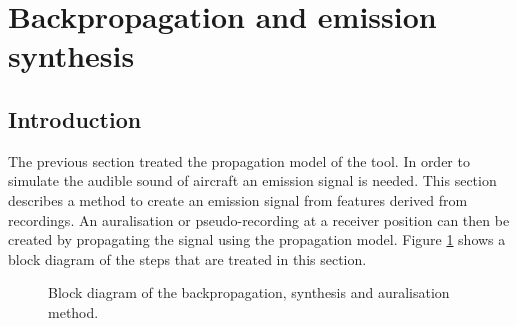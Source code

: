 \section{Backpropagation and emission synthesis}\label{sec:tool:synthesis}

\subsection{Introduction}
The previous section treated the propagation model of the tool. In order to
simulate the audible sound of aircraft an emission signal is needed.
This section describes a method to create an emission signal from features derived from
recordings. An auralisation or pseudo-recording at a receiver position can then
be created by propagating the signal using the propagation model. Figure
\ref{fig:tool:backpropagation:introduction:block-diagram} shows a block diagram
of the steps that are treated in this section.

\begin{figure}[H]
  \centering
{}
  \caption{Block diagram of the backpropagation, synthesis and auralisation method.}
  \label{fig:tool:backpropagation:introduction:block-diagram}
\end{figure}


